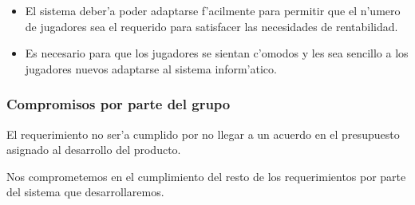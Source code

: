 \begin{itemize}


\item {}

    El sistema deber'a poder adaptarse f'acilmente para permitir que el n'umero de jugadores sea el requerido para satisfacer las necesidades de rentabilidad.

\item {}

    Es necesario para que los jugadores se sientan c'omodos y les sea sencillo a los jugadores nuevos adaptarse al sistema inform'atico.

\end{itemize}


\subsubsection{Compromisos por parte del grupo}

El requerimiento  no ser'a cumplido por no llegar a un acuerdo en el presupuesto asignado al desarrollo del producto.

Nos comprometemos en el cumplimiento del resto de los requerimientos por parte del sistema que desarrollaremos.
